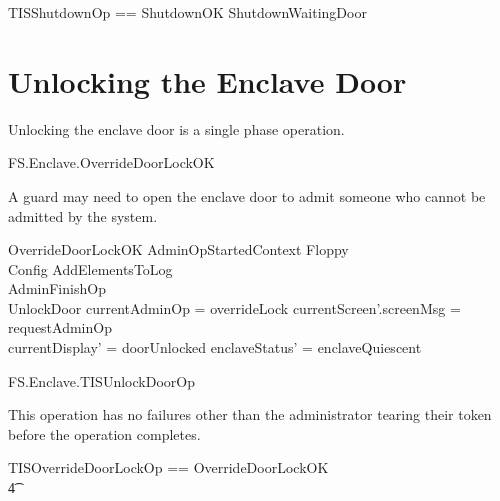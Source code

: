 \begin{zed}
        TISShutdownOp == ShutdownOK \lor ShutdownWaitingDoor
\end{zed}

\section{Unlocking the Enclave Door}

Unlocking the enclave door is a single phase operation.

\begin{traceunit}{FS.Enclave.OverrideDoorLockOK}
\end{traceunit}

A guard may need to open the enclave door to admit someone who cannot
be admitted by the system.

\begin{schema}{OverrideDoorLockOK}
        AdminOpStartedContext
\also   
        \Xi Floppy
\\      \Xi Config
\also
        AddElementsToLog
\\      AdminFinishOp
\\      UnlockDoor
\where
        \The currentAdminOp = overrideLock
\also
        currentScreen'.screenMsg = requestAdminOp
\\      currentDisplay' = doorUnlocked
\also
        enclaveStatus' = enclaveQuiescent
\end{schema}

\begin{traceunit}{FS.Enclave.TISUnlockDoorOp}
\end{traceunit}

This operation has no failures other
than the administrator tearing their token before the operation completes.

\begin{zed}
        TISOverrideDoorLockOp == OverrideDoorLockOK
\\ \t4  \lor
        [~ BadAdminLogout | enclaveStatus = waitingStartAdminOp 
\\ \t6  \land \The currentAdminOp = overrideLock     ~]
\end{zed}


